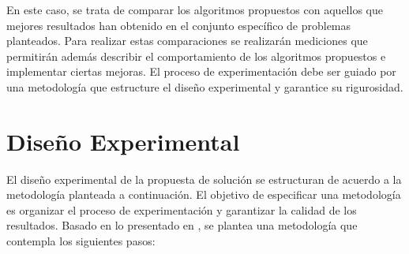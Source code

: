 En este caso, se trata de comparar los algoritmos propuestos con aquellos que mejores resultados han obtenido en el conjunto específico de problemas planteados. Para realizar estas comparaciones se realizarán mediciones que permitirán además describir el comportamiento de los algoritmos propuestos e implementar ciertas mejoras. El proceso de experimentación debe ser guiado por una metodología que estructure el diseño experimental y garantice su rigurosidad. 
\section{Diseño Experimental}

El diseño experimental de la propuesta de solución se estructuran de acuerdo a la metodología planteada a continuación. El objetivo  de especificar una metodología es organizar el proceso de experimentación y garantizar la calidad de los resultados. Basado en lo presentado en \cite{BartzBeielstein2014ExperimentalAO}, se plantea una metodología que contempla los siguientes pasos:
